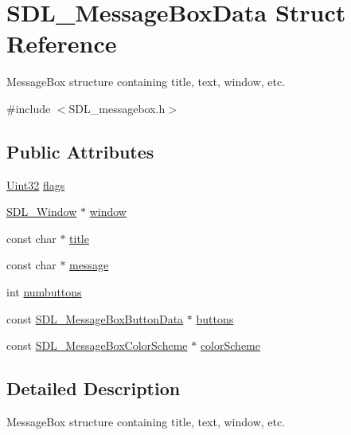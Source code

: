 \hypertarget{struct_s_d_l___message_box_data}{}\section{S\+D\+L\+\_\+\+Message\+Box\+Data Struct Reference}
\label{struct_s_d_l___message_box_data}


Message\+Box structure containing title, text, window, etc.  




{\ttfamily \#include $<$S\+D\+L\+\_\+messagebox.\+h$>$}

\subsection*{Public Attributes}
\begin{DoxyCompactItemize}
\item 
\mbox{\hyperlink{_s_d_l__stdinc_8h_add440eff171ea5f55cb00c4a9ab8672d}{Uint32}} \mbox{\hyperlink{struct_s_d_l___message_box_data_a113d016f760bf4e4156b0f376358d6a0}{flags}}
\item 
\mbox{\hyperlink{_s_d_l__video_8h_a55a196c7d3b8497538632c79ae1e6392}{S\+D\+L\+\_\+\+Window}} $\ast$ \mbox{\hyperlink{struct_s_d_l___message_box_data_a5c333bc93705c66068e140bc28daedcb}{window}}
\item 
const char $\ast$ \mbox{\hyperlink{struct_s_d_l___message_box_data_a93ceeafeed20b553ad4c86c9be37f117}{title}}
\item 
const char $\ast$ \mbox{\hyperlink{struct_s_d_l___message_box_data_ada6ae208a1f85adabbd7a7a08ca609c8}{message}}
\item 
int \mbox{\hyperlink{struct_s_d_l___message_box_data_a133f4fef549cc0cb14b799af35f3dc5a}{numbuttons}}
\item 
const \mbox{\hyperlink{struct_s_d_l___message_box_button_data}{S\+D\+L\+\_\+\+Message\+Box\+Button\+Data}} $\ast$ \mbox{\hyperlink{struct_s_d_l___message_box_data_a265e47aab749e384661ae91d3e11e0db}{buttons}}
\item 
const \mbox{\hyperlink{struct_s_d_l___message_box_color_scheme}{S\+D\+L\+\_\+\+Message\+Box\+Color\+Scheme}} $\ast$ \mbox{\hyperlink{struct_s_d_l___message_box_data_a18744865a3e89e260db5f01aee579e35}{color\+Scheme}}
\end{DoxyCompactItemize}


\subsection{Detailed Description}
Message\+Box structure containing title, text, window, etc. 


